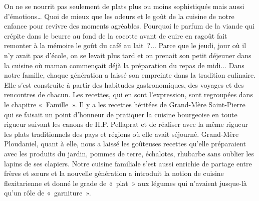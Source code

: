 On ne se nourrit pas seulement de plats plus ou moins sophistiqués mais aussi d'émotions… Quoi de mieux que les odeurs et le goût de la cuisine de notre enfance pour revivre des moments agréables. Pourquoi le parfum de la viande qui crépite dans le beurre au fond de la cocotte avant de cuire en ragoût fait remonter à la mémoire le goût du café au lait ?$\ldots$ Parce que le jeudi, jour où il n’y avait pas d’école, on se levait plus tard et on prenait son petit déjeuner dans la cuisine où maman commençait déjà la préparation du repas de midi$\ldots$
Dans notre famille, chaque génération a laissé son empreinte dans la tradition
culinaire. Elle s’est construite à partir des habitudes gastronomiques, des
voyages et des rencontres de chacun. Les recettes, qui en sont l’expression, sont
regroupées dans le chapitre « Famille ». Il y a les recettes héritées de
Grand-Mère Saint-Pierre qui se faisait un point d’honneur de pratiquer la
cuisine bourgeoise en toute rigueur suivant les canons de H.P.
Pellaprat \cite{pellaprat} et de réaliser avec la même rigueur les plats traditionnels des pays et régions où elle avait séjourné. Grand-Mère Ploudaniel, quant à elle, nous a laissé les goûteuses recettes qu’elle préparaient avec les produits du jardin, pommes de terre, échalotes, rhubarbe sans oublier les lapins de ses clapiers. Notre cuisine familiale s’est aussi enrichie de partage entre frères et sœurs et la nouvelle génération a introduit la notion de cuisine flexitarienne et donné le grade de « plat » aux légumes qui n’avaient jusque-là qu’un rôle de « garniture ».
